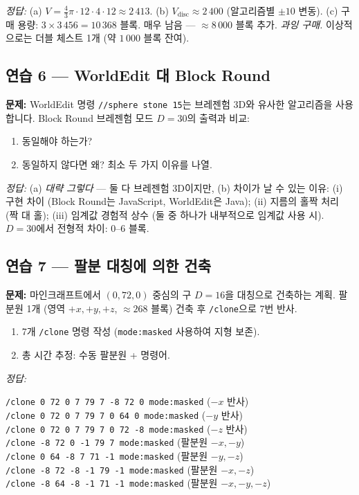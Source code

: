 \documentclass[12pt,a4paper]{scrartcl}
\newcommand{\cmd}[1]{\textcolor{earth}{\texttt{\small #1}}}
\begin{document}
\emph{정답:}
(a) $V = \tfrac{4}{3}\pi \cdot 12 \cdot 4 \cdot 12 \approx 2\,413$.
(b) $V_{\mathrm{disc}} \approx 2\,400$ (알고리즘별 $\pm 10$ 변동).
(c) 구매 용량: $3 \times 3\,456 = 10\,368$ 블록. 매우 남음 --- $\approx 8\,000$ 블록 추가. \emph{과잉 구매.} 이상적으로는 더블 체스트 1개 (약 $1\,000$ 블록 잔여).

\subsection*{연습 6 --- WorldEdit 대 Block Round}
\textbf{문제:} WorldEdit 명령 \cmd{//sphere stone 15}는 브레젠험 3D와 유사한 알고리즘을 사용합니다. Block Round 브레젠험 모드 $D = 30$의 출력과 비교:
\begin{enumerate}[label=\alph*),leftmargin=1.5em,itemsep=0.1em,topsep=0.2em,nosep]
  \item 동일해야 하는가?
  \item 동일하지 않다면 왜? 최소 두 가지 이유를 나열.
\end{enumerate}

\emph{정답:}
(a) \emph{대략 그렇다} --- 둘 다 브레젠험 3D이지만, (b) 차이가 날 수 있는 이유: (i) 구현 차이 (Block Round는 JavaScript, WorldEdit은 Java); (ii) 지름의 홀짝 처리 (짝 대 홀); (iii) 임계값 경험적 상수 (둘 중 하나가 내부적으로 임계값 사용 시). $D = 30$에서 전형적 차이: 0--6 블록.

\subsection*{연습 7 --- 팔분 대칭에 의한 건축}
\textbf{문제:} 마인크래프트에서 $(0, 72, 0)$ 중심의 구 $D = 16$을 대칭으로 건축하는 계획. 팔분원 1개 (영역 $+x, +y, +z$, $\approx 268$ 블록) 건축 후 \cmd{/clone}으로 7번 반사.
\begin{enumerate}[label=\alph*),leftmargin=1.5em,itemsep=0.1em,topsep=0.2em,nosep]
  \item 7개 \cmd{/clone} 명령 작성 (\cmd{mode:masked} 사용하여 지형 보존).
  \item 총 시간 추정: 수동 팔분원 + 명령어.
\end{enumerate}

\emph{정답:}

\begin{minecraft}[명령 시퀀스]
\cmd{/clone 0 72 0 7 79 7 -8 72 0 mode:masked} \quad ($-x$ 반사)\\
\cmd{/clone 0 72 0 7 79 7 0 64 0 mode:masked} \quad\quad ($-y$ 반사)\\
\cmd{/clone 0 72 0 7 79 7 0 72 -8 mode:masked} \quad ($-z$ 반사)\\
\cmd{/clone -8 72 0 -1 79 7 mode:masked} \quad\quad\;\; (팔분원 $-x,-y$)\\
\cmd{/clone 0 64 -8 7 71 -1 mode:masked} \quad\quad\;\; (팔분원 $-y,-z$)\\
\cmd{/clone -8 72 -8 -1 79 -1 mode:masked} \quad\;\; (팔분원 $-x,-z$)\\
\cmd{/clone -8 64 -8 -1 71 -1 mode:masked} \quad\;\; (팔분원 $-x,-y,-z$)
\end{minecraft}
\end{document}
